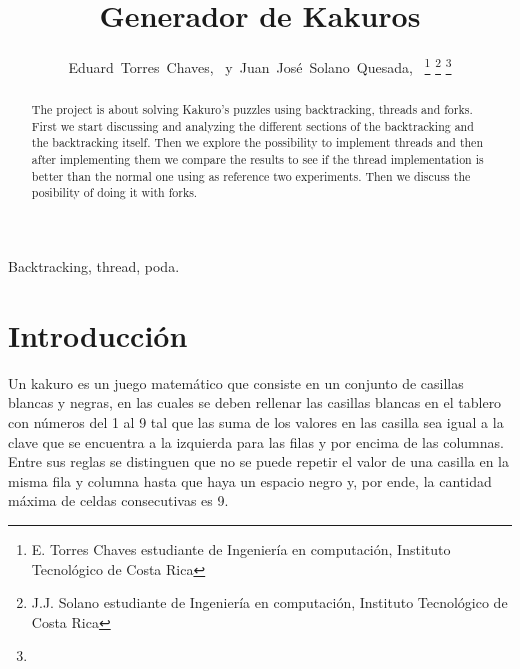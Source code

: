 \documentclass[journal]{IEEEtran}
\begin{document}
\title{Generador de Kakuros}
\author{Eduard~Torres~Chaves,~\IEEEmembership{}
        y~Juan~José~Solano~Quesada,~\IEEEmembership{}
\thanks{E. Torres Chaves estudiante de Ingeniería en computación, Instituto Tecnológico de Costa Rica}%
\thanks{J.J. Solano estudiante de Ingeniería en computación, Instituto Tecnológico de Costa Rica}%
\thanks{}}
\maketitle
\begin{abstract}
The project is about solving Kakuro's puzzles using backtracking, threads and forks. First we start discussing and analyzing the different sections of the backtracking and the backtracking itself. Then we explore the possibility to implement threads and then after implementing them we compare the results to see if the thread implementation is better than the normal one using as reference two experiments. Then we discuss the posibility of doing it with forks.

\end{abstract}
\begin{IEEEkeywords}
Backtracking, thread, poda.
\end{IEEEkeywords}
\IEEEpeerreviewmaketitle

\section{Introducción}
Un kakuro es un juego matemático que consiste en un conjunto de casillas blancas y negras, en las cuales se deben rellenar las casillas blancas en el tablero con números del 1 al 9 tal que las suma de los valores en las casilla sea igual a la clave que se encuentra a la izquierda para las filas y por encima de las columnas.
Entre sus reglas se distinguen que no se puede repetir el valor de una casilla en la misma fila y columna hasta que haya un espacio negro y, por ende, la cantidad máxima de celdas consecutivas es 9.
\end{document}
